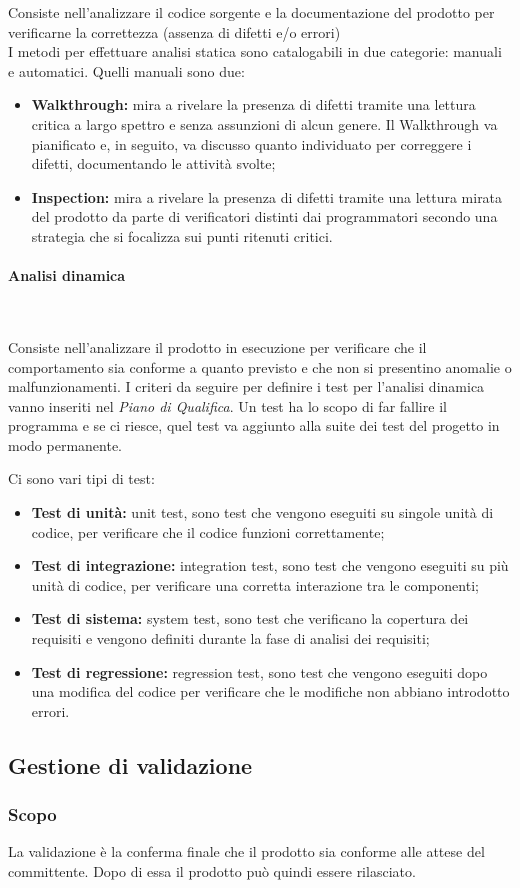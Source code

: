 Consiste nell'analizzare il codice sorgente e la documentazione del prodotto per verificarne la correttezza (assenza di difetti e/o errori)\\
I metodi per effettuare analisi statica sono catalogabili in due categorie: manuali e automatici.
Quelli manuali sono due:
\begin{itemize}
    \item \textbf{Walkthrough:} mira a rivelare la presenza di difetti tramite una lettura critica a largo spettro e senza assunzioni di alcun genere. Il Walkthrough va pianificato e, in seguito, va discusso quanto individuato per correggere i difetti, documentando le attività svolte;
    \item \textbf{Inspection:} mira a rivelare la presenza di difetti tramite una lettura mirata del prodotto da parte di verificatori distinti dai programmatori secondo una strategia che si focalizza sui punti ritenuti critici. 
\end{itemize}

\paragraph{Analisi dinamica} ~

Consiste nell'analizzare il prodotto in esecuzione per verificare che il comportamento sia conforme a quanto previsto e che non si presentino anomalie o malfunzionamenti.
I criteri da seguire per definire i test per l'analisi dinamica vanno inseriti nel \textit{Piano di Qualifica}. Un test ha lo scopo di far fallire il programma e se ci riesce, quel test va aggiunto alla suite dei test del progetto in modo permanente.

Ci sono vari tipi di test:
\begin{itemize}
    \item \textbf{Test di unità:} unit test, sono test che vengono eseguiti su singole unità di codice, per verificare che il codice funzioni correttamente;
    \item \textbf{Test di integrazione:} integration test, sono test che vengono eseguiti su più unità di codice, per verificare una corretta interazione tra le componenti;
    \item \textbf{Test di sistema:} system test, sono test che verificano la copertura dei requisiti e vengono definiti durante la fase di analisi dei requisiti;
    \item \textbf{Test di regressione:} regression test, sono test che vengono eseguiti dopo una modifica del codice per verificare che le modifiche non abbiano introdotto errori.
\end{itemize}

\subsection{Gestione di validazione}
\subsubsection{Scopo} 
La validazione è la conferma finale che il prodotto sia conforme alle attese del committente. Dopo di essa il prodotto può quindi essere rilasciato.\\



